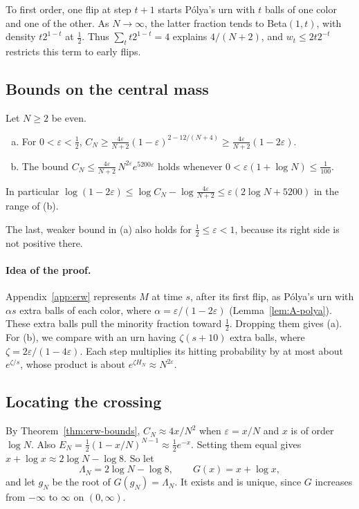 To first order, one flip at step $t+1$ starts P\'olya's urn with $t$
balls of one color and one of the other. As $N\to\infty$, the latter
fraction tends to Beta$(1,t)$, with density $t2^{1-t}$ at $\frac12$.
Thus $\sum_tt2^{1-t}=4$ explains $4/(N+2)$, and $w_t\le2t2^{-t}$
restricts this term to early flips.

\subsection{Bounds on the central mass}

\begin{theorem}\label{thm:erw-bounds}
Let $N\ge2$ be even.
\begin{enumerate}[(a)]
\item For $0<\varepsilon<\frac12$,
$C_N\ge\frac{4\varepsilon}{N+2}(1-\varepsilon)^{2-12/(N+4)}
\ge\frac{4\varepsilon}{N+2}(1-2\varepsilon)$.
\item The bound
$C_N\le\frac{4\varepsilon}{N+2}\,N^{2\varepsilon}e^{5200\varepsilon}$ holds
whenever $0<\varepsilon(1+\log N)\le\frac1{100}$.
\end{enumerate}
In particular
$\log(1-2\varepsilon)\le\log C_N-\log\frac{4\varepsilon}{N+2}\le\varepsilon(2\log N+5200)$
in the range of (b).
\end{theorem}

The last, weaker bound in (a) also holds for
$\frac12\le\varepsilon<1$, because its right side is not positive there.

\paragraph{Idea of the proof.}
Appendix~\ref{app:erw} represents $M$ at time $s$, after its first flip,
as P\'olya's urn with $\alpha s$ extra balls of each color, where
$\alpha=\varepsilon/(1-2\varepsilon)$ (Lemma~\ref{lem:A-polya}). These extra balls pull the minority fraction toward $\frac12$.
Dropping them gives (a). For (b), we compare with an urn having $\zeta(s+10)$ extra balls, where
$\zeta=2\varepsilon/(1-4\varepsilon)$. Each step multiplies its hitting
probability by at most about $e^{\zeta/s}$, whose product is about
$e^{\zeta H_N}\approx N^{2\varepsilon}$.

\subsection{Locating the crossing}

By Theorem~\ref{thm:erw-bounds},
$C_N\approx4x/N^2$ when $\varepsilon=x/N$ and $x$ is of order $\log N$. Also
$E_N=\frac12(1-x/N)^{N-1}\approx\frac12e^{-x}$. Setting them equal gives
$x+\log x\approx2\log N-\log8$. So let
\[
 \Lambda_N=2{\log N}-\log8,\qquad G(x)=x+\log x,
\]
and let $g_N$ be the root of $G(g_N)=\Lambda_N$. It exists and is unique,
since $G$ increases from $-\infty$ to $\infty$ on $(0,\infty)$.

